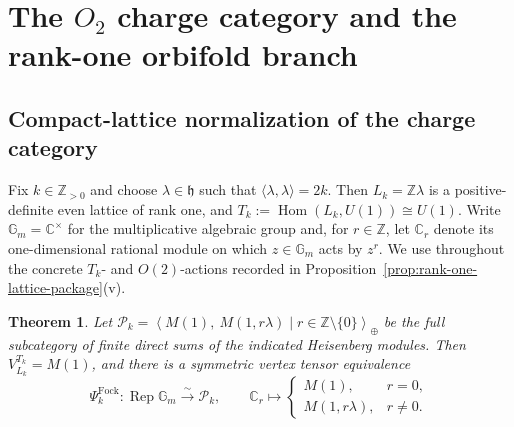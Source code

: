 \documentclass[10pt,a4paper]{amsart}
\numberwithin{equation}{section} \newtheorem{thm}{Theorem}[section] \newtheorem{lem}[thm]{Lemma} \newtheorem{ex}[thm]{Example} \newtheorem{prop}[thm]{Proposition} \newtheorem{cor}[thm]{Corollary} \newtheorem{defi}[thm]{Definition} \newtheorem{rmk}[thm]{Remark} \newtheorem{notation}[thm]{Notation}
\newcommand{\Rep}{\operatorname{Rep}}
\newcommand{\Hom}{\operatorname{Hom}}
\def\Z{\mathbb{Z}} \def\N{\mathbb{N}} \def\A{\mathbb{A}} \def\C{\mathbb{C}} \def\R{\mathbb{R}} \def\Q{\mathbb{Q}} \def\F{\mathbb{F}}
\begin{document}
\section{The \texorpdfstring{$O_2$}{O2} charge category and the rank-one orbifold branch}\label{sec:o2}

\subsection{Compact-lattice normalization of the charge category}

Fix \(k\in\Z_{>0}\) and choose \(\lambda\in\mathfrak h\) such that \(\langle\lambda,\lambda\rangle=2k\). Then \(L_k=\Z\lambda\) is a positive-definite even lattice of rank one, and \(T_k:=\Hom(L_k,U(1))\cong U(1)\). Write \(\mathbb G_m=\C^\times\) for the multiplicative algebraic group and, for \(r\in\Z\), let \(\C_r\) denote its one-dimensional rational module on which \(z\in\mathbb G_m\) acts by \(z^r\). We use throughout the concrete $T_k$- and $O(2)$-actions recorded in Proposition~\ref{prop:rank-one-lattice-package}(v).

\begin{thm}\label{thm:Fock-Gm}
Let \(\mathcal P_k=\left\langle M(1),\ M(1,r\lambda)\mid r\in\Z\setminus\{0\}\right\rangle_{\oplus}\) be the full subcategory of finite direct sums of the indicated Heisenberg modules. Then \(V_{L_k}^{T_k}=M(1)\), and there is a symmetric vertex tensor equivalence
\[
\Psi_k^{\mathrm{Fock}}:\Rep\mathbb G_m\overset{\sim}{\longrightarrow}\mathcal P_k,
\qquad
\C_r\longmapsto
\begin{cases}
M(1),&r=0,\\
M(1,r\lambda),&r\ne0.
\end{cases}
\]
\end{thm}
\end{document}
